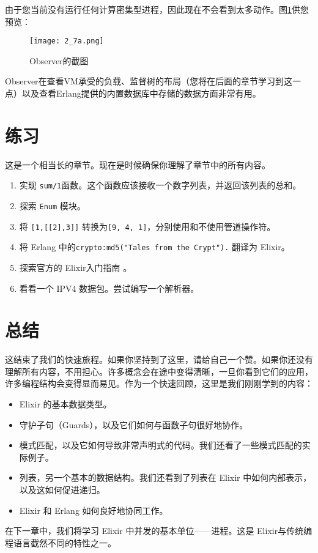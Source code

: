 由于您当前没有运行任何计算密集型进程，因此现在不会看到太多动作。图\ref{fig:2_7a}供您预览：

\begin{figure}[!ht]
    \centering
    \texttt{[image: 2\_7a.png]}
    \caption{Observer的截图}
    \label{fig:2_7a}
\end{figure}

Observer在查看VM承受的负载、监督树的布局（您将在后面的章节学习到这一点）以及查看Erlang提供的内置数据库中存储的数据方面非常有用。

 \section{练习}

这是一个相当长的章节。现在是时候确保你理解了章节中的所有内容。

\begin{enumerate}
\def\labelenumi{\arabic{enumi}.}

\item 实现 \texttt{sum/1}函数。这个函数应该接收一个数字列表，并返回该列表的总和。
\item 探索 \texttt{Enum} 模块。
\item 将 \texttt{[1,[[2],3]]} 转换为\texttt{[9, 4, 1]}，分别使用和不使用管道操作符。
\item 将 Erlang 中的\texttt{crypto:md5("Tales from the Crypt").} 翻译为
  Elixir。
\item 探索官方的 Elixir入门指南
	  。
\item
  看看一个 IPV4 数据包。尝试编写一个解析器。
\end{enumerate}

\section{总结}

这结束了我们的快速旅程。如果你坚持到了这里，请给自己一个赞。如果你还没有理解所有内容，不用担心。许多概念会在途中变得清晰，一旦你看到它们的应用，许多编程结构会变得显而易见。作为一个快速回顾，这里是我们刚刚学到的内容：

\begin{itemize}

\item  Elixir 的基本数据类型。
\item  守护子句（Guards），以及它们如何与函数子句很好地协作。
\item  模式匹配，以及它如何导致非常声明式的代码。我们还看了一些模式匹配的实际例子。
\item  列表，另一个基本的数据结构。我们还看到了列表在 Elixir  中如何内部表示，以及这如何促进递归。
\item  Elixir 和 Erlang 如何良好地协同工作。
\end{itemize}

在下一章中，我们将学习 Elixir 中并发的基本单位------进程。这是 Elixir与传统编程语言截然不同的特性之一。

\printnotes*